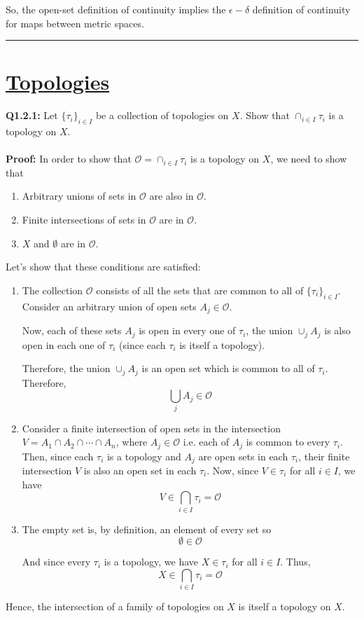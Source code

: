 \documentclass[twoside]{article}
\begin{document}
So, the open-set definition of continuity implies the $\epsilon-\delta$ definition of continuity for maps between metric spaces.
\vskip 0.25cm
\hrule
\vskip 1cm

\section*{\underline{Topologies}}

\textbf{Q1.2.1:} Let $\{ \tau_i \}_{i \in I}$ be a collection of topologies on $X$. Show that $\cap_{i \in I} \tau_i$ is a topology on $X$.
\\
\\
\textbf{Proof:} In order to show that $\mathcal{O} = \cap_{i \in I} \tau_i$ is a topology on $X$, we need to show that 
\begin{enumerate}[label=(\alph*)]
   \item Arbitrary unions of sets in $\mathcal{O}$ are also in $\mathcal{O}$.
   \item Finite intersections of sets in $\mathcal{O}$ are in $\mathcal{O}$.
   \item $X$ and $\emptyset$ are in $\mathcal{O}$.
\end{enumerate}
Let's show that these conditions are satisfied:
\begin{enumerate}[label=(\alph*)]
   \item The collection $\mathcal{O}$ consists of all the sets that are common to all of $\{\tau_i\}_{i \in I}$. Consider an arbitrary union of open sets $ A_j \in \mathcal{O}$.

   Now, each of these sets $A_j$ is open in every one of $\tau_i$, the union $\cup_{j} A_j$ is also open in each one of $\tau_i$ (since each $\tau_i$ is itself a topology).
   
   Therefore, the union $\cup_{j} A_j$ is an open set which is common to all of $\tau_i$. Therefore,
   \[ \bigcup_{j} A_j \in \mathcal{O} \]

   \item Consider a finite intersection of open sets in the intersection $V = A_1 \cap A_2 \cap \cdots \cap A_n$, where $A_j \in \mathcal{O}$ i.e. each of $A_j$ is common to every $\tau_i$. Then, since each $\tau_i$ is a topology and $A_j$ are open sets in each $\tau_i$, their finite intersection $V$ is also an open set in each $\tau_i$. Now, since $V \in \tau_{i}$ for all $i \in I$, we have 
   \[ V \in \bigcap_{i \in I} \tau_i = \mathcal{O} \]

   \item The empty set is, by definition, an element of every set so 
   \[ \emptyset \in \mathcal{O} \]

   And since every $\tau_i$ is a topology, we have $X \in \tau_i$ for all $i \in I$. Thus,
   \[ X \in \bigcap_{i \in I} \tau_i = \mathcal{O}\]
\end{enumerate}
Hence, the intersection of a family of topologies on $X$ is itself a topology on $X$.
\end{document}
